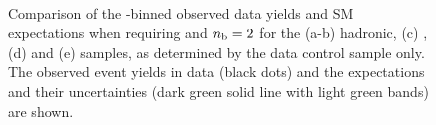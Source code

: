\clearpage
\begin{figure}[t!]
  \begin{center}
     \\
    \caption{\label{fig:best-fit-control-only-le3j2b} Comparison of the
      \scalht-binned observed data yields and SM expectations when
      requiring \njetlow and $n_{\text{b}} = 2$ for the (a-b) hadronic, (c)
      \mj, (d) \mmj and (e) \gj samples, as determined by the \mj data
      control sample only. The observed event yields in data (black
      dots) and the expectations and their uncertainties (dark green
      solid line with light green bands) are shown. }
  \end{center}
\end{figure}

